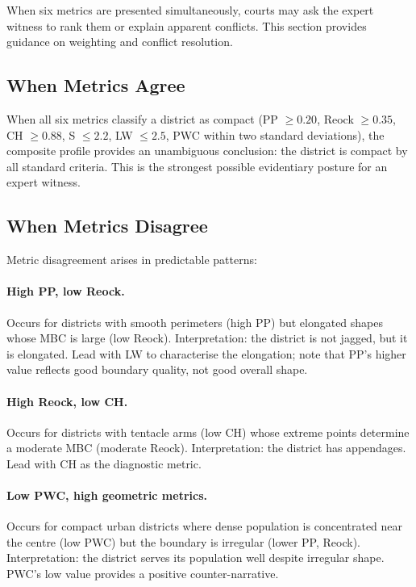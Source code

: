 When six metrics are presented simultaneously, courts may ask the expert witness
to rank them or explain apparent conflicts.
This section provides guidance on weighting and conflict resolution.

\subsection{When Metrics Agree}

When all six metrics classify a district as compact (PP $\geq 0.20$,
Reock $\geq 0.35$, CH $\geq 0.88$, S $\leq 2.2$, LW $\leq 2.5$, PWC within
two standard deviations), the composite profile provides an unambiguous conclusion:
the district is compact by all standard criteria.
This is the strongest possible evidentiary posture for an expert witness.

\subsection{When Metrics Disagree}

Metric disagreement arises in predictable patterns:

\paragraph{High PP, low Reock.}
Occurs for districts with smooth perimeters (high PP) but elongated shapes
whose MBC is large (low Reock).
Interpretation: the district is not jagged, but it is elongated.
Lead with LW to characterise the elongation; note that PP's higher value
reflects good boundary quality, not good overall shape.

\paragraph{High Reock, low CH.}
Occurs for districts with tentacle arms (low CH) whose extreme points determine
a moderate MBC (moderate Reock).
Interpretation: the district has appendages. Lead with CH as the diagnostic metric.

\paragraph{Low PWC, high geometric metrics.}
Occurs for compact urban districts where dense population is concentrated
near the centre (low PWC) but the boundary is irregular (lower PP, Reock).
Interpretation: the district serves its population well despite irregular shape.
PWC's low value provides a positive counter-narrative.

